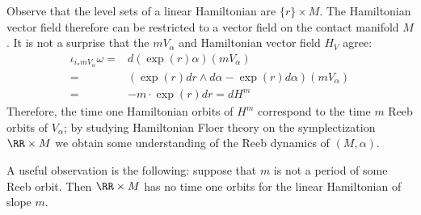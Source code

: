 
 

Observe that the level sets of a linear Hamiltonian are  $\{r\}\times M$. The Hamiltonian vector field therefore can be restricted to a vector field on the contact manifold $M$. It is not a surprise that the $m V_\alpha$ and Hamiltonian vector field $H_V$ agree:
\begin{align*}
    \iota_{i_* m V_\alpha}\omega=& d(\exp(r) \alpha )(m V_\alpha)\\
     =&(\exp(r) dr \wedge d\alpha - \exp(r) d\alpha) (m V_\alpha)\\
    =&- m \cdot \exp(r)dr = dH^m
\end{align*}
Therefore, the time one Hamiltonian orbits of $H^m$ correspond to the time $m$ Reeb orbits of $V_\alpha$; by studying Hamiltonian Floer theory on the symplectization $\RR\times M$ we obtain some understanding of the Reeb dynamics of $(M, \alpha)$.

A useful observation is the following: suppose that $m$ is not a period of some Reeb orbit. Then $\RR\times M$ has no time one orbits for the linear Hamiltonian of slope $m$.
 